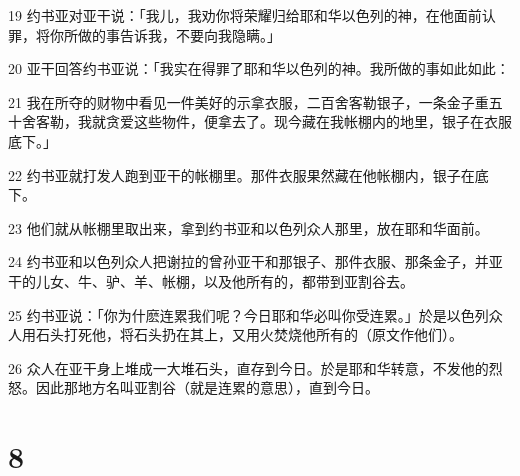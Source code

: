 \par 19 约书亚对亚干说：「我儿，我劝你将荣耀归给耶和华以色列的神，在他面前认罪，将你所做的事告诉我，不要向我隐瞒。」
\par 20 亚干回答约书亚说：「我实在得罪了耶和华以色列的神。我所做的事如此如此：
\par 21 我在所夺的财物中看见一件美好的示拿衣服，二百舍客勒银子，一条金子重五十舍客勒，我就贪爱这些物件，便拿去了。现今藏在我帐棚内的地里，银子在衣服底下。」
\par 22 约书亚就打发人跑到亚干的帐棚里。那件衣服果然藏在他帐棚内，银子在底下。
\par 23 他们就从帐棚里取出来，拿到约书亚和以色列众人那里，放在耶和华面前。
\par 24 约书亚和以色列众人把谢拉的曾孙亚干和那银子、那件衣服、那条金子，并亚干的儿女、牛、驴、羊、帐棚，以及他所有的，都带到亚割谷去。
\par 25 约书亚说：「你为什麽连累我们呢？今日耶和华必叫你受连累。」於是以色列众人用石头打死他，将石头扔在其上，又用火焚烧他所有的（原文作他们）。
\par 26 众人在亚干身上堆成一大堆石头，直存到今日。於是耶和华转意，不发他的烈怒。因此那地方名叫亚割谷（就是连累的意思），直到今日。

\chapter{8}

